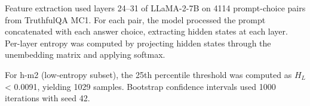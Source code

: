 
Feature extraction used layers 24--31 of LLaMA-2-7B on 4114 prompt-choice pairs from TruthfulQA MC1. For each pair, the model processed the prompt concatenated with each answer choice, extracting hidden states at each layer. Per-layer entropy was computed by projecting hidden states through the unembedding matrix and applying softmax.

For h-m2 (low-entropy subset), the 25th percentile threshold was computed as $H_L$ < 0.0091, yielding 1029 samples. Bootstrap confidence intervals used 1000 iterations with seed 42.

